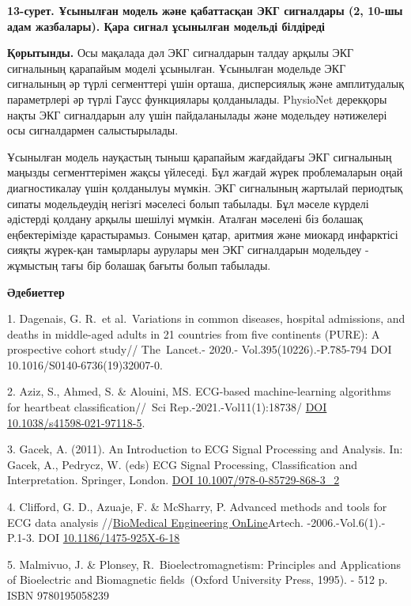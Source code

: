 {{\bfseries 13-сурет. Ұсынылған модель және қабаттасқан ЭКГ сигналдары (2,
10-шы адам жазбалары). Қара сигнал ұсынылған модельді білдіреді}

{\bfseries Қорытынды.} Осы мақалада дәл ЭКГ сигналдарын талдау арқылы ЭКГ
сигналының қарапайым моделі ұсынылған. Ұсынылған модельде ЭКГ сигналының
әр түрлі сегменттері үшін орташа, дисперсиялық және амплитудалық
параметрлері әр түрлі Гаусс функциялары қолданылады. PhysioNet дерекқоры
нақты ЭКГ сигналдарын алу үшін пайдаланылады және модельдеу нәтижелері
осы сигналдармен салыстырылады.

Ұсынылған модель науқастың тыныш қарапайым жағдайдағы ЭКГ сигналының
маңызды сегменттерімен жақсы үйлеседі. Бұл жағдай жүрек проблемаларын
оңай диагностикалау үшін қолданылуы мүмкін. ЭКГ сигналының жартылай
периодтық сипаты модельдеудің негізгі мәселесі болып табылады. Бұл
мәселе күрделі әдістерді қолдану арқылы шешілуі мүмкін. Аталған мәселені
біз болашақ еңбектерімізде қарастырамыз. Сонымен қатар, аритмия және
миокард инфарктісі сияқты жүрек-қан тамырлары аурулары мен ЭКГ
сигналдарын модельдеу - жұмыстың тағы бір болашақ бағыты болып табылады.

{\bfseries Әдебиеттер}

1. Dagenais, G. R.~et al.~Variations in common diseases, hospital
admissions, and deaths in middle-aged adults in 21 countries from five
continents (PURE): A prospective cohort study// The~Lancet.- 2020.-
Vol.395(10226).-P.785-794 DOI 10.1016/S0140-6736(19)32007-0.

2. Aziz, S., Ahmed, S. \& Alouini, MS. ECG-based machine-learning
algorithms for heartbeat classification//~Sci Rep.-2021.-Vol11(1):18738/
\href{https://doi.org/10.1038/s41598-021-97118-5}{DOI
10.1038/s41598-021-97118-5}.

3. Gacek, A. (2011). An Introduction to ECG Signal Processing and
Analysis. In: Gacek, A., Pedrycz, W. (eds) ECG Signal Processing,
Classification and Interpretation. Springer, London.
\href{https://doi.org/10.1007/978-0-85729-868-3_2}{DOI
10.1007/978-0-85729-868-3\_2}

4. Clifford, G. D., Azuaje, F. \& McSharry, P. Advanced methods and
tools for ECG data analysis
//\href{https://www.researchgate.net/journal/BioMedical-Engineering-OnLine-1475-925X?_tp=eyJjb250ZXh0Ijp7ImZpcnN0UGFnZSI6InB1YmxpY2F0aW9uIiwicGFnZSI6InB1YmxpY2F0aW9uIn19}{BioMedical
Engineering OnLine}Artech. -2006.-Vol.6(1).- P.1-3. DOI
\href{http://dx.doi.org/10.1186/1475-925X-6-18}{10.1186/1475-925X-6-18}

5. Malmivuo, J. \& Plonsey, R.~Bioelectromagnetism: Principles and
Applications of Bioelectric and Biomagnetic fields~(Oxford University
Press, 1995). - 512 p. ISBN 9780195058239

}
